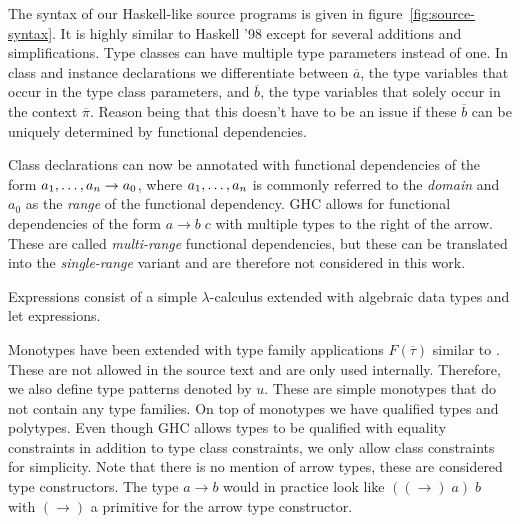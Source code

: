 The syntax of our Haskell-like source programs is given in
figure~\ref{fig:source-syntax}. It is highly similar to Haskell '98 except for
several additions and simplifications. Type classes can have
multiple type parameters instead of one. In class and instance declarations we
differentiate between $\overline{a}$, the type variables that occur in the type
class parameters, and $\overline{b}$, the type variables that solely occur in the
context $\overline{\pi}$. Reason being that this doesn't have to be an issue if
these $\overline{b}$ can be uniquely determined by functional dependencies.

Class declarations can now be annotated with functional dependencies of the form
$a_1, \mathellipsis, a_n \rightarrow a_0$, where $a_1, \mathellipsis, a_n$ is
commonly referred to the \textit{domain} and $a_0$ as the \textit{range} of the
functional dependency. GHC allows for functional dependencies of the form $a
\rightarrow b \; c$ with multiple types to the right of the arrow. These are
called \textit{multi-range} functional dependencies, but these can be translated
into the \textit{single-range} variant \cite{fundeps-chrs} and are therefore not
considered in this work.

Expressions consist of a simple $\lambda$-calculus extended with algebraic data
types and let expressions.

Monotypes have been extended with type family applications $F(\overline{\tau})$
\cite{associated-types-with-class} similar to \systemfc. These are not
allowed in the source text and are only used internally. Therefore, we also
define type patterns denoted by $u$. These are simple monotypes that do not
contain any type families. On top of monotypes we have qualified types and
polytypes. Even though GHC allows types to be qualified with equality
constraints in addition to type class constraints, we only allow class
constraints for simplicity. Note that there is no mention of arrow types, these
are considered type constructors. The type $a \rightarrow b$ would in practice
look like $((\rightarrow) \; a) \; b$ with $(\rightarrow)$ a primitive for the
arrow type constructor.

